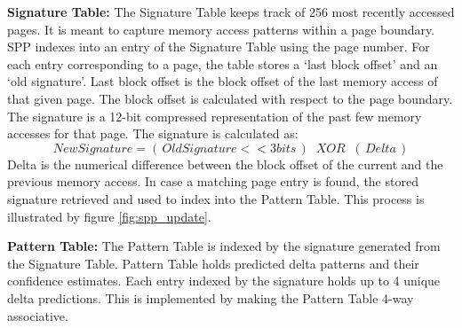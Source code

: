 \textbf{Signature Table:} The Signature Table keeps track of 256 most recently
accessed pages.  It is meant to capture memory access patterns within a page
boundary.  SPP indexes into an entry of the Signature Table using the page
number.  For each entry corresponding to a page, the table stores a `last
block offset' and an `old signature'.  Last block offset is the block offset
of the last memory access of that given page.  The block offset is calculated
with respect to the page boundary.  The signature is a 12-bit compressed
representation of the past few memory accesses for that page.  The signature
is calculated as: $$New Signature = (\,Old Signature << 3 bits\,) \;\;XOR\;\;
(\,Delta\,)$$ Delta is the numerical difference between the block offset of
the current and the previous memory access. In case a matching page entry is
found, the stored signature retrieved and used to index into the Pattern
Table. This process is illustrated by figure \ref{fig:spp_update}.

\textbf{Pattern Table:} The Pattern Table is indexed by the signature
generated from the Signature Table.  Pattern Table holds predicted delta
patterns and their confidence estimates. Each entry indexed by the signature
holds up to 4 unique delta predictions.  This is implemented by making the
Pattern Table 4-way associative.



